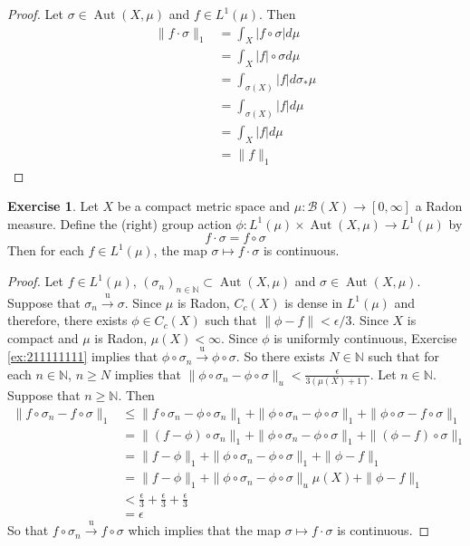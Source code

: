 \documentclass[12pt]{amsart}
\theoremstyle{definition}
\newtheorem{ex}[definition]{Exercise}
\newcommand{\ep}{\epsilon}
\newcommand{\sig}{\sigma}
\newcommand{\N}{\mathbb{N}}
\newcommand{\MB}{\mathcal{B}}
\newcommand{\RG}{[0,\infty]}
\newcommand{\convt}[1]{\xrightarrow{\text{#1}}}
\DeclareMathOperator{\Aut}{Aut}
\DeclareMathOperator*{\0}{\mbf{0}}
\DeclareMathOperator*{\1}{\mbf{1}}
\newcommand{\lex}[1]{\label{ex:#1}}
\newcommand{\rex}[1]{Exercise \ref{ex:#1}}
\begin{document}
	\begin{proof}
	Let $\sig \in \Aut(X, \mu)$ and $f \in L^1(\mu)$. 
Then 
	\begin{align*}
	\|f \cdot \sig\|_1
	&=  \int_X |f \circ \sig| d\mu \\
	&=  \int_X |f| \circ \sig d\mu \\
	&=  \int_{\sig(X)} |f| d \sig_* \mu  \\
	&=  \int_{\sig(X)} |f| d \mu \\
	&=  \int_{X} |f| d \mu \\
	&= \|f\|_1 
	\end{align*}	 
	\end{proof}
	
	\begin{ex} \lex{}
	Let $X$ be a compact metric space and $\mu:\MB(X) \rightarrow \RG$ a Radon measure. Define the (right) group action $\phi: L^1(\mu) \times \Aut(X, \mu) \rightarrow L^1(\mu) $ by 
	$$f \cdot \sig = f \circ \sig$$	
	Then for each $f \in L^1(\mu)$, the map $\sig \mapsto  f \cdot \sig$ is continuous.  
	\end{ex}
	
	\begin{proof}
	Let $f \in L^1(\mu)$, $(\sig_n)_{n \in \N} \subset \Aut(X, \mu)$ and $\sig \in \Aut(X, \mu)$. Suppose that $\sig_n \convt{u} \sig$. Since $\mu$ is Radon, $C_c(X)$ is dense in $L^1(\mu)$ and therefore, there exists $\phi \in C_c(X)$ such that $\|\phi - f\| < \ep/3$. Since $X$ is compact and $\mu$ is Radon, $\mu(X) < \infty$. Since $\phi$ is uniformly continuous, \rex{211111111} implies that $\phi \circ \sig_n \convt{u} \phi \circ \sig$.  So there exists $N \in \N$ such that for each $n \in \N$, $n \geq N$ implies that $\|\phi \circ \sig_n - \phi \circ \sig\|_u < \frac{\ep}{3 (\mu(X)+1)}$. Let $n \in \N$. Suppose that $n \geq \N$. Then 
	\begin{align*}
	\|f \circ \sig_n - f \circ \sig\|_1 
	&\leq \|f \circ \sig_n - \phi \circ \sig_n \|_1 + \|\phi \circ \sig_n - \phi \circ \sig\|_1 + \|\phi \circ \sig - f \circ \sig\|_1 \\
	& = \|(f - \phi) \circ \sig_n \|_1 + \|\phi \circ \sig_n - \phi \circ \sig\|_1 + \|(\phi - f) \circ \sig\|_1 \\
	&= \|f - \phi  \|_1 + \|\phi \circ \sig_n - \phi \circ \sig\|_1 + \|\phi - f \|_1 \\
	&= \|f - \phi  \|_1 + \|\phi \circ \sig_n - \phi \circ \sig\|_u \mu(X) + \|\phi - f \|_1 \\
	&< \frac{\ep}{3} + \frac{\ep}{3} + \frac{\ep}{3} \\
	&= \ep
	\end{align*}
	So that $f \circ \sig_n \convt{u} f \circ \sig$ which implies that the map $\sig \mapsto  f \cdot \sig$ is continuous. 
	\end{proof}
	
\end{document}
